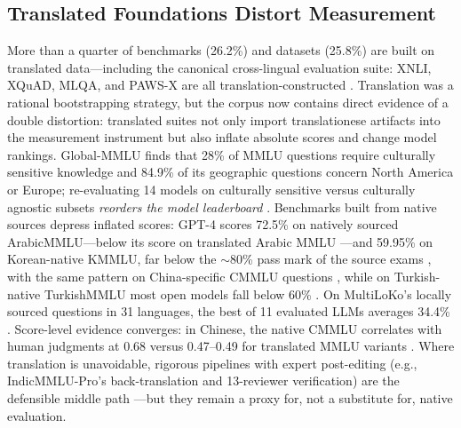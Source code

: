 \documentclass[letterpaper]{article} %
\begin{document}
\subsection{Translated Foundations Distort Measurement}
More than a quarter of benchmarks (26.2\%) and datasets (25.8\%) are built on translated data---including the canonical cross-lingual evaluation suite: XNLI, XQuAD, MLQA, and PAWS-X are all translation-constructed \cite{conneau2018xnlievaluatingcrosslingualsentence,Artetxe_2020,lewis2019mlqa,yang2019paws}. Translation was a rational bootstrapping strategy, but the corpus now contains direct evidence of a double distortion: translated suites not only import translationese artifacts into the measurement instrument but also inflate absolute scores and change model rankings. Global-MMLU finds that 28\% of MMLU questions require culturally sensitive knowledge and 84.9\% of its geographic questions concern North America or Europe; re-evaluating 14 models on culturally sensitive versus culturally agnostic subsets \emph{reorders the model leaderboard} \cite{singh2024global}. Benchmarks built from native sources depress inflated scores: GPT-4 scores 72.5\% on natively sourced ArabicMMLU---below its score on translated Arabic MMLU \cite{koto2024arabicmmlu}---and 59.95\% on Korean-native KMMLU, far below the $\sim$80\% pass mark of the source exams \cite{son2024kmmlu}, with the same pattern on China-specific CMMLU questions \cite{li2023cmmlu}, while on Turkish-native TurkishMMLU most open models fall below 60\% \cite{yuksel2024turkishmmlu}. On MultiLoKo's locally sourced questions in 31 languages, the best of 11 evaluated LLMs averages 34.4\% \cite{hupkes2025multiloko}. Score-level evidence converges: in Chinese, the native CMMLU correlates with human judgments at 0.68 versus 0.47--0.49 for translated MMLU variants \cite{wu2025bitter}. Where translation is unavoidable, rigorous pipelines with expert post-editing (e.g., IndicMMLU-Pro's back-translation and 13-reviewer verification) are the defensible middle path \cite{sankalp2025indicmmlu}---but they remain a proxy for, not a substitute for, native evaluation.
 
\end{document}

